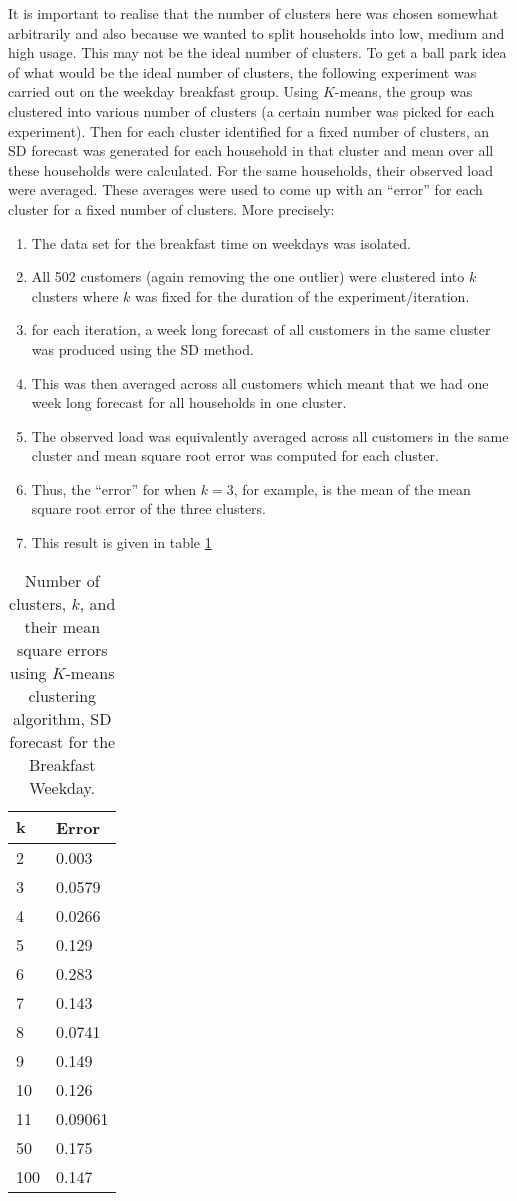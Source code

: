\documentclass[a4paper]{article}
\begin{document}
It is important to realise that the number of clusters here was chosen somewhat arbitrarily and also because we wanted to split households into low, medium and high usage. This may not be the ideal number of clusters. To get a ball park idea of what would be the ideal number of clusters, the following experiment was carried out on the weekday breakfast group. Using $K$-means, the group was clustered into various number of clusters (a certain number was picked for each experiment). Then for each cluster identified for a fixed number of clusters, an SD forecast was generated for each household in that cluster and mean over all these households were calculated. For the same households, their observed load were averaged. These averages were used to come up with an ``error'' for each cluster for a fixed number of clusters. More precisely:
\begin{enumerate} \label{k_errs}
\item The data set for the breakfast time on weekdays was isolated.
\item All 502 customers (again removing the one outlier) were clustered into $k$ clusters where $k$ was fixed for the duration of the experiment/iteration.
\item for each iteration, a week long forecast of all customers in the same cluster was produced using the SD method.
\item This was then averaged across all customers which meant that we had one week long forecast for all households in one cluster.
\item The observed load was equivalently averaged across all customers in the same cluster and mean square root error was computed for each cluster.
\item Thus, the ``error'' for when $k=3$, for example, is the mean of the mean square root error of the three clusters.
\item This result is given in table \ref{tab:cluserrs}
\end{enumerate}

\begin{table}
\centering
\begin{tabular}{|l|l|}
\hline
$\textbf{k}$& \textbf{Error}\\
\hline
2 & 0.003\\
\hline
3 & 0.0579\\
\hline
4 & 0.0266\\
\hline
5 &0.129\\
\hline
6 & 0.283\\
\hline
7 & 0.143\\
\hline
8 & 0.0741\\
\hline
9 & 0.149\\
\hline
10 & 0.126 \\
\hline
11 & 0.09061\\
\hline
50 & 0.175\\
\hline
100 & 0.147\\
\hline
\end{tabular}
\caption{Number of clusters, $k$, and their mean square errors using $K$-means clustering algorithm, SD forecast for the Breakfast Weekday.}
\label{tab:cluserrs}
\end{table}
\end{document}
